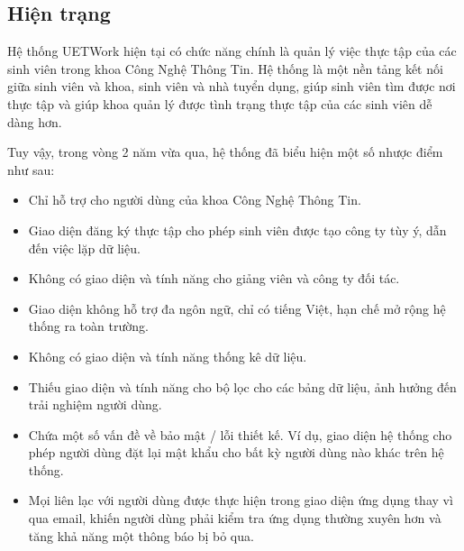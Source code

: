 \documentclass[./../main.tex]{subfiles}
\begin{document}
\subsection{Hiện trạng}

Hệ thống UETWork hiện tại có chức năng chính là quản lý việc thực tập của các sinh viên trong khoa Công Nghệ Thông Tin. Hệ thống là một nền tảng kết nối giữa sinh viên và khoa, sinh viên và nhà tuyển dụng, giúp sinh viên tìm được nơi thực tập và giúp khoa quản lý được tình trạng thực tập của các sinh viên dễ dàng hơn.

Tuy vậy, trong vòng 2 năm vừa qua, hệ thống đã biểu hiện một số nhược
điểm như sau:

\begin{itemize}
	\item

	      Chỉ hỗ trợ cho người dùng của khoa Công Nghệ Thông Tin.

	\item

	      Giao diện đăng ký thực tập cho phép sinh viên được tạo công ty tùy ý, dẫn đến việc lặp dữ liệu.

	\item

	      Không có giao diện và tính năng cho giảng viên và công ty đối tác.

	\item

	      Giao diện không hỗ trợ đa ngôn ngữ, chỉ có tiếng Việt, hạn chế mở rộng hệ thống ra toàn trường.

	\item

	      Không có giao diện và tính năng thống kê dữ liệu.

	\item

	      Thiếu giao diện và tính năng cho bộ lọc cho các bảng dữ liệu, ảnh hưởng đến trải nghiệm người dùng.

	\item

	      Chứa một số vấn đề về bảo mật / lỗi thiết kế. Ví dụ, giao diện hệ thống cho phép người dùng đặt lại mật khẩu cho bất kỳ người dùng nào khác trên hệ thống.

	\item

	      Mọi liên lạc với người dùng được thực hiện trong giao diện ứng dụng thay vì qua email, khiến người dùng phải kiểm tra ứng dụng thường xuyên hơn và tăng khả năng một thông báo bị bỏ qua.

\end{itemize}
\end{document}
